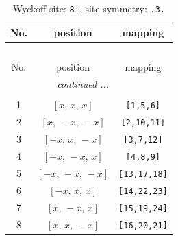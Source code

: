 \documentclass[fleqn,8pt]{jsarticle}
\begin{document}
\renewcommand{\arraystretch}{1.2}
\begin{longtable}{ccc}
\caption{Wyckoff site: {\tt 8i}, site symmetry: {\tt .3.}}
 \\
 \hline \hline
No. & position & mapping \\ \hline \endfirsthead

\multicolumn{2}{l}{\tablename\ \thetable{}} \\
 \hline \hline
No. & position & mapping \\ \hline \endhead

 \hline \hline
\multicolumn{2}{r}{\footnotesize\it continued ...} \\ \endfoot

 \hline \hline
\multicolumn{2}{r}{} \\ \endlastfoot

1 & $\left[ x,\, x,\, x \right]$ & {\tt [1,5,6]} \\ \hline
2 & $\left[ x,\, - x,\, - x \right]$ & {\tt [2,10,11]} \\ \hline
3 & $\left[ - x,\, x,\, - x \right]$ & {\tt [3,7,12]} \\ \hline
4 & $\left[ - x,\, - x,\, x \right]$ & {\tt [4,8,9]} \\ \hline
5 & $\left[ - x,\, - x,\, - x \right]$ & {\tt [13,17,18]} \\ \hline
6 & $\left[ - x,\, x,\, x \right]$ & {\tt [14,22,23]} \\ \hline
7 & $\left[ x,\, - x,\, x \right]$ & {\tt [15,19,24]} \\ \hline
8 & $\left[ x,\, x,\, - x \right]$ & {\tt [16,20,21]} \\
\end{longtable}
\renewcommand{\arraystretch}{1.2}
\end{document}
